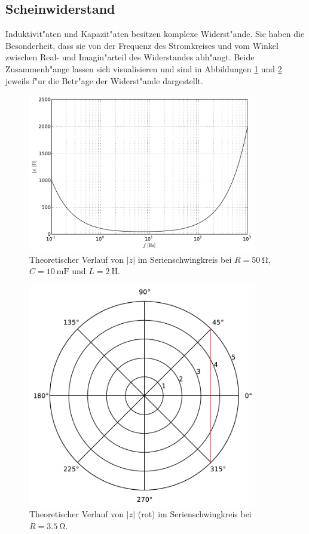 	\subsection{Scheinwiderstand}
		Induktivit"aten und Kapazit"aten besitzen komplexe Widerst"ande.
		Sie haben die Besonderheit, dass sie von der Frequenz des Stromkreises und vom Winkel zwischen Real- und Imagin"arteil des Widerstandes abh"angt.
		Beide Zusammenh"ange lassen sich visualisieren und sind in Abbildungen \ref{z_frequenz} und \ref{z_winkel} jeweils f"ur die Betr"age der Widerst"ande dargestellt.

		\begin{figure}[h]
			\centering
			\includegraphics[width = 10cm]{img/z_f.pdf}
			\caption{Theoretischer Verlauf von $|z|$ im Serienschwingkreis bei $R = \SI{50}{\ohm}$, $C = \SI{10}{\milli \farad}$ und $L = \SI{2}{\henry}$.}
			\label{z_frequenz}
		\end{figure}

		\begin{figure}[h]
			\centering
			\includegraphics[width = 10cm]{img/z_phi.pdf}
			\caption{Theoretischer Verlauf von $|z|$ (rot) im Serienschwingkreis bei $R = \SI{3.5}{\ohm}$.}
			\label{z_winkel}
		\end{figure}
		\clearpage
